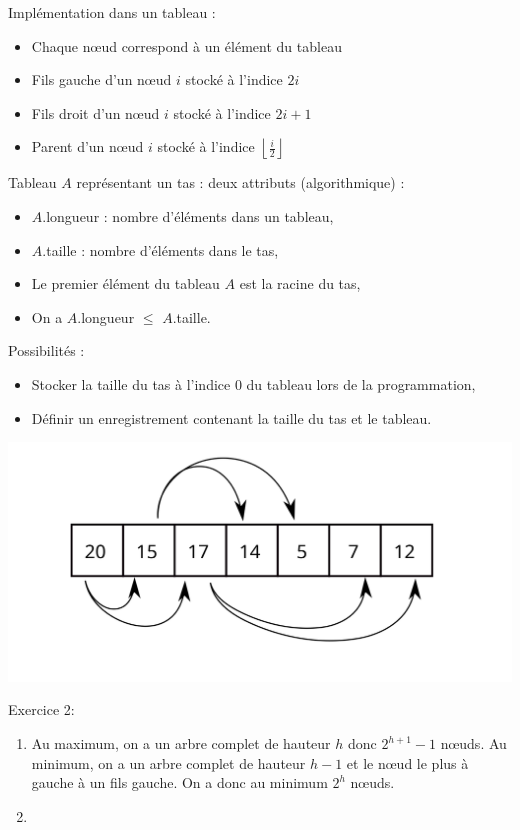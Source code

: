 Implémentation dans un tableau :

\begin{itemize}
\tightlist
\item
  Chaque nœud correspond à un élément du tableau
\item
  Fils gauche d'un nœud \(i\) stocké à l'indice \(2i\)
\item
  Fils droit d'un nœud \(i\) stocké à l'indice \(2i + 1\)
\item
  Parent d'un nœud \(i\) stocké à l'indice
  \(\left\lfloor \frac{i}{2} \right\rfloor\)
\end{itemize}

Tableau \(A\) représentant un tas : deux attributs (algorithmique) :

\begin{itemize}
\tightlist
\item
  \(A\).longueur : nombre d'éléments dans un tableau,
\item
  \(A\).taille : nombre d'éléments dans le tas,
\item
  Le premier élément du tableau \(A\) est la racine du tas,
\item
  On a \(A\).longueur \(\leqslant\) \(A\).taille.
\end{itemize}

Possibilités :

\begin{itemize}
\tightlist
\item
  Stocker la taille du tas à l'indice 0 du tableau lors de la
  programmation,
\item
  Définir un enregistrement contenant la taille du tas et le tableau.
\end{itemize}

\includegraphics{figures/tas.svg}

Exercice 2:

\begin{enumerate}
\def\labelenumi{\arabic{enumi}.}
\tightlist
\item
  Au maximum, on a un arbre complet de hauteur \(h\) donc
  \(2^{h+1} - 1\) nœuds. Au minimum, on a un arbre complet de hauteur
  \(h - 1\) et le nœud le plus à gauche à un fils gauche. On a donc au
  minimum \(2^h\) nœuds.
\item
\end{enumerate}


